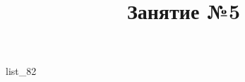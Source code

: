 \documentclass[12pt, a4paper]{article}
\begin{document}
	\title{Занятие №5}
	{list_82}
\end{document}
